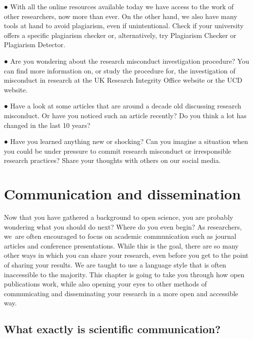 \documentclass[
]{book}
\begin{document}
● With all the online resources available today we have access to the work of other researchers, now more than ever. On the other hand, we also have many tools at hand to avoid plagiarism, even if unintentional. Check if your university offers a specific plagiarism checker or, alternatively, try Plagiarism Checker or Plagiarism Detector.

● Are you wondering about the research misconduct investigation procedure? You can find more information on, or study the procedure for, the investigation of misconduct in research at the UK Research Integrity Office website or the UCD website.

● Have a look at some articles that are around a decade old discussing research misconduct. Or have you noticed such an article recently? Do you think a lot has changed in the last 10 years?

● Have you learned anything new or shocking? Can you imagine a situation when you could be under pressure to commit research misconduct or irresponsible research practices? Share your thoughts with others on our social media.

\hypertarget{communication-and-dissemination}{%
\chapter{\texorpdfstring{\textbf{Communication and dissemination}}{Communication and dissemination}}\label{communication-and-dissemination}}

Now that you have gathered a background to open science, you are probably wondering what you should do next? Where do you even begin? As researchers, we~are often encouraged to focus on academic communication such as journal articles and conference presentations. While this is the goal, there are so many other ways in which you can share your research, even before you get to the point of sharing your results. We are taught to use a language style that is often inaccessible to the majority. This chapter is going to take you through how open publications work, while also opening your eyes to other methods of communicating and disseminating your research in a more open and accessible way.

\hypertarget{what-exactly-is-scientific-communication}{%
\section{\texorpdfstring{\textbf{What exactly is scientific communication?}}{What exactly is scientific communication?}}\label{what-exactly-is-scientific-communication}}
\end{document}
